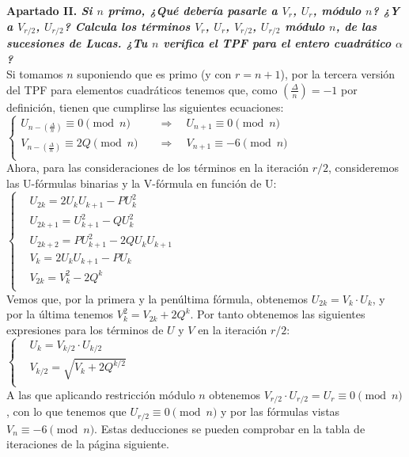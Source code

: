 \documentclass[fleqn]{article}
\def\next{\quad \Rightarrow \quad}
\begin{document}
    \newpage
    \textbf{Apartado II. \textit{Si $n$ primo, ¿Qué debería pasarle a $V_r$, $U_r$, módulo $n$? ¿Y a $V_{r/2}$, $U_{r/2}$?
            Calcula los términos $V_r$, $U_r$, $V_{r/2}$, $U_{r/2}$ módulo $n$, de las sucesiones de Lucas.
            ¿Tu $n$ verifica el TPF para el entero cuadrático $\alpha$?}}\\
    Si tomamos $n$ suponiendo que es primo (y con $r = n+1$), por la tercera versión del TPF para elementos cuadráticos tenemos que, como 
    $\left(\frac{\Delta}{n}\right) = -1$ por definición, tienen que cumplirse las siguientes ecuaciones:\\ 
    $\left\{
    \begin{aligned}
        U_{n-\left(\frac{\Delta}{n}\right)} \equiv 0 \pmod{n} &\next U_{n+1} \equiv 0 \pmod{n} \\
        V_{n-\left(\frac{\Delta}{n}\right)} \equiv 2Q \pmod{n} &\next V_{n+1} \equiv -6 \pmod{n} \\
    \end{aligned}
    \right.$\\
    Ahora, para las consideraciones de los términos en la iteración $r/2$, consideremos las U-fórmulas binarias y la V-fórmula en función de U: \\
    $\left\{
        \begin{aligned}
            &U_{2k} = 2 U_k U_{k+1} - P U_k^2\\
            &U_{2k+1} = U_{k+1}^2 - Q U_k^2\\
            &U_{2k+2} = P U_{k+1}^2 - 2Q U_k U_{k+1} \\
            &V_k = 2 U_k U_{k+1} - P U_k\\
            &V_{2k} = V_{k}^2 - 2Q^k\\
        \end{aligned}
    \right.$\\
    Vemos que, por la primera y la penúltima fórmula, obtenemos $U_{2k} = V_k \cdot U_k$, y por la última tenemos $ V_{k}^2 = V_{2k} + 2Q^k$.
    Por tanto obtenemos las siguientes expresiones para los términos de $U$ y $V$ en la iteración $r/2$:\\
    $\left\{
        \begin{aligned}
            &U_{k} = V_{k/2} \cdot U_{k/2} \\
            &V_{k/2} = \sqrt{V_{k} + 2Q^{k/2}} \\
        \end{aligned}
    \right.$\\
    A las que aplicando restricción módulo $n$ obtenemos  $V_{r/2} \cdot U_{r/2} = U_{r} \equiv 0 \pmod{n}$, con lo que tenemos que $U_{r/2} \equiv 0 \pmod{n}$ 
    y por las fórmulas vistas $V_n \equiv -6 \pmod{n}$. Estas deducciones se pueden comprobar en la tabla de iteraciones de la página siguiente.
    
\end{document}

